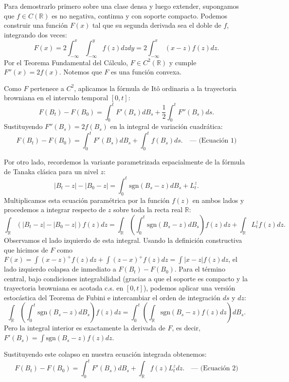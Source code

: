 \documentclass[11pt, letterpaper]{article}
\begin{document}
\begin{solucion}
    Para demostrarlo primero sobre una clase densa y luego extender, supongamos que $f \in C(\mathbb{R})$ es no negativa, continua y con soporte compacto.
    Podemos construir una función $F(x)$ tal que su segunda derivada sea el doble de $f$, integrando dos veces:
    \[ F(x) = 2 \int_{-\infty}^x \int_{-\infty}^y f(z) dz dy = 2 \int_{-\infty}^x (x-z)f(z)dz. \]
    Por el Teorema Fundamental del Cálculo, $F \in C^2(\mathbb{R})$ y cumple $F''(x) = 2f(x)$. Notemos que $F$ es una función convexa.
    
    Como $F$ pertenece a $C^2$, aplicamos la fórmula de Itô ordinaria a la trayectoria browniana en el intervalo temporal $[0,t]$:
    \[ F(B_t) - F(B_0) = \int_0^t F'(B_s) dB_s + \frac{1}{2} \int_0^t F''(B_s) ds. \]
    Sustituyendo $F''(B_s) = 2f(B_s)$ en la integral de variación cuadrática:
    \[ F(B_t) - F(B_0) = \int_0^t F'(B_s) dB_s + \int_0^t f(B_s) ds. \quad \text{--- (Ecuación 1)} \]
    
    Por otro lado, recordemos la variante parametrizada espacialmente de la fórmula de Tanaka clásica para un nivel $z$:
    \[ |B_t - z| - |B_0 - z| = \int_0^t \text{sgn}(B_s - z) dB_s + L_t^z. \]
    Multiplicamos esta ecuación paramétrica por la función $f(z)$ en ambos lados y procedemos a integrar respecto de $z$ sobre toda la recta real $\mathbb{R}$:
    \[ \int_{\mathbb{R}} (|B_t - z| - |B_0 - z|) f(z) dz = \int_{\mathbb{R}} \left( \int_0^t \text{sgn}(B_s - z) dB_s \right) f(z) dz + \int_{\mathbb{R}} L_t^z f(z) dz. \]
    Observamos el lado izquierdo de esta integral. Usando la definición constructiva que hicimos de $F$ como $F(x) = \int (x-z)^+ f(z) dz + \int (z-x)^+ f(z) dz = \int |x-z| f(z) dz$, el lado izquierdo colapsa de inmediato a $F(B_t) - F(B_0)$.
    Para el término central, bajo condiciones integrabilidad (gracias a que el soporte es compacto y la trayectoria browniana es acotada c.s. en $[0,t]$), podemos aplicar una versión estocástica del Teorema de Fubini e intercambiar el orden de integración $ds$ y $dz$:
    \[ \int_{\mathbb{R}} \left( \int_0^t \text{sgn}(B_s - z) dB_s \right) f(z) dz = \int_0^t \left( \int_{\mathbb{R}} \text{sgn}(B_s - z) f(z) dz \right) dB_s. \]
    Pero la integral interior es exactamente la derivada de $F$, es decir, $F'(B_s) = \int \text{sgn}(B_s - z) f(z) dz$.
    
    Sustituyendo este colapso en nuestra ecuación integrada obtenemos:
    \[ F(B_t) - F(B_0) = \int_0^t F'(B_s) dB_s + \int_{\mathbb{R}} f(z) L_t^z dz. \quad \text{--- (Ecuación 2)} \]
    

\end{solucion}
\end{document}
